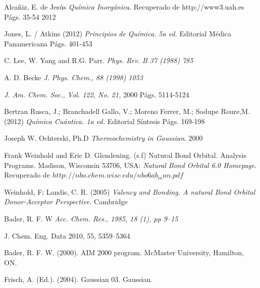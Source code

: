 \begin{thebibliography}{9}

Alcañiz, E. de Jesús
\textit{Química Inorgánica}. 
Recuperado de http://www3.uah.es Págs. 35-54
2012

Jones, L. / Atkins (2012)
\textit{Principios de Química. 5a ed.} Editorial Médica Panamericana
Págs. 401-453

C. Lee, W. Yang and R.G. Parr.
\textit{ Phys. Rev. B 37 (1988) 785}

A. D. Becke
\textit{J. Phys. Chem., 88 (1998) 1053}

\textit{J. Am. Chem. Soc., Vol. 122, No. 21, }
2000 Págs. 5114-5124

Bertran Rusca, J.; Branchadell Gallo, V.; Moreno Ferrer, M.; Sodupe Roure,M. (2012)
\textit{Química Cuántica. 1a ed.} Editorial Síntesis
Págs. 169-198

Joseph W. Ochterski, Ph.D
\textit{Thermochemistry in Gaussian}.
2000

Frank Weinhold and Eric D. Glendening. (s.f) Natural Bond Orbital. Analysis Programs. Madison, Wisconsin 53706, USA: 
\textit {Natural Bond Orbital 6.0 Homepage}. Recuperado de $http://nbo.chem.wisc.edu/nbo6ab_man.pdf$

Weinhold, F; Landis, C. R. (2005) 
\textit{Valency and Bonding. A natural Bond Orbital Donor-Acceptor Perspective.}
Cambridge

Bader, R. F. W
\textit{Acc. Chem. Res., 1985, 18 (1), pp 9–15}

J. Chem. Eng. Data 2010, 55, 5359–5364

Bader, R. F. W. (2000). AIM 2000 program. McMaster University, Hamilton, ON.

Frisch, A. (Ed.). (2004). Gaussian 03. Gaussian.

\end{thebibliography}
